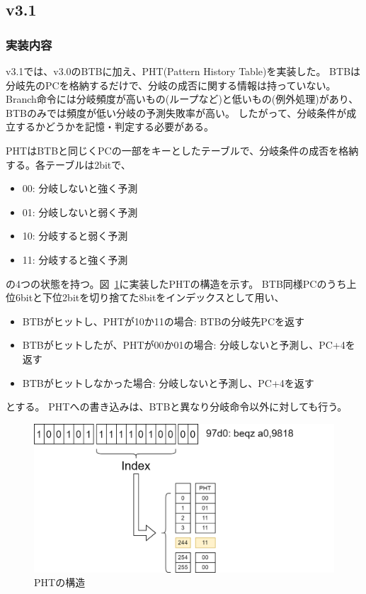 \documentclass[dvipdfmx,10pt,a4paper,titlepage]{jsarticle}
\begin{document}
    \subsection{v3.1}
    \subsubsection{実装内容}
    v3.1では、v3.0のBTBに加え、PHT(Pattern History Table)を実装した。
    BTBは分岐先のPCを格納するだけで、分岐の成否に関する情報は持っていない。
    Branch命令には分岐頻度が高いもの(ループなど)と低いもの(例外処理)があり、BTBのみでは頻度が低い分岐の予測失敗率が高い。
    したがって、分岐条件が成立するかどうかを記憶・判定する必要がある。

    PHTはBTBと同じくPCの一部をキーとしたテーブルで、分岐条件の成否を格納する。各テーブルは2bitで、
    \begin{itemize}
        \item 00: 分岐しないと強く予測
        \item 01: 分岐しないと弱く予測
        \item 10: 分岐すると弱く予測
        \item 11: 分岐すると強く予測
    \end{itemize}
    の4つの状態を持つ。図~\ref{fig:pht}に実装したPHTの構造を示す。
    BTB同様PCのうち上位6bitと下位2bitを切り捨てた8bitをインデックスとして用い、
    \begin{itemize}
        \item BTBがヒットし、PHTが10か11の場合: BTBの分岐先PCを返す
        \item BTBがヒットしたが、PHTが00か01の場合: 分岐しないと予測し、PC+4を返す
        \item BTBがヒットしなかった場合: 分岐しないと予測し、PC+4を返す
    \end{itemize}
    とする。
    PHTへの書き込みは、BTBと異なり分岐命令以外に対しても行う。
    \begin{figure}
        \centering
        \includegraphics[width=12cm]{figure/pht.png}
        \caption{PHTの構造}\label{fig:pht}
    \end{figure}
\end{document}
